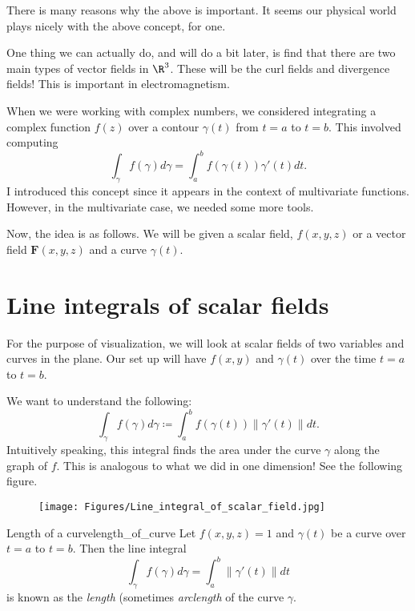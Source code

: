         \begin{remark}
        There is many reasons why the above is important.  It seems our physical world plays nicely with the above concept, for one.
        
        One thing we can actually do, and will do a bit later, is find that there are two main types of vector fields in $\R^3$.  These will be the curl fields and divergence fields!  This is important in electromagnetism.
        \end{remark}
        
        When we were working with complex numbers, we considered integrating a complex function $f(z)$ over a contour $\gamma(t)$ from $t=a$ to $t=b$.  This involved computing
        \[
        \int_\gamma f(\gamma)d\gamma = \int_a^b f(\gamma(t))\gamma'(t)dt.
        \]
        I introduced this concept since it appears in the context of multivariate functions.  However, in the multivariate case, we needed some more tools.
        
        Now, the idea is as follows.  We will be given a scalar field, $f(x,y,z)$ or a vector field $\mathbf{F}(x,y,z)$ and a curve $\gamma(t)$.  
        
        \section{Line integrals of scalar fields}
        For the purpose of visualization, we will look at scalar fields of two variables and curves in the plane.  Our set up will have $f(x,y)$ and $\gamma(t)$ over the time $t=a$ to $t=b$.
        
        We want to understand the following:
        \[
        \int_\gamma f(\gamma)d\gamma \coloneqq \int_a^b f(\gamma(t))\|\gamma'(t)\|dt.
        \]
        Intuitively speaking, this integral finds the area under the curve $\gamma$ along the graph of $f$.  This is analogous to what we did in one dimension! See the following figure.
        \begin{figure}[H]
            \centering
            \texttt{[image: Figures/Line\_integral\_of\_scalar\_field.jpg]}
        \end{figure}
        
        \begin{ex}{Length of a curve}{length_of_curve}
        Let $f(x,y,z)=1$ and $\gamma(t)$ be a curve over $t=a$ to $t=b$.  Then the line integral
        \[
        \int_\gamma f(\gamma)d\gamma = \int_a^b \|\gamma'(t)\|dt
        \]
        is known as the \emph{length} (sometimes \emph{arclength} of the curve $\gamma$.
        \end{ex}
        
